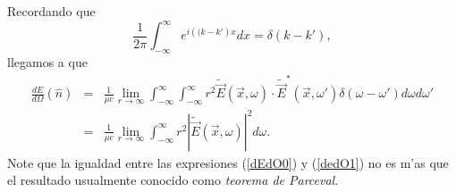 Recordando que
\begin{equation}
\frac{1}{2\pi}\int_{-\infty}^{\infty }e^{i\left((  k-k' \right)  x}dx=
\delta\left(  k-k' \right),
\end{equation}
llegamos a que
\begin{eqnarray}
\frac{dE}{d\Omega}(\hat{n})
&=&\frac{1}{\mu c}\lim_{r\to\infty}\int_{-\infty}^{\infty}\int_{-\infty}^{\infty} r^2\tilde{\vec{E}}(\vec{x},\omega)\cdot\tilde{\vec{E}}^\ast(\vec{x},\omega') \delta (\omega-\omega')  d\omega d\omega'\\
&=&\frac{1}{\mu c}\lim_{r\to\infty}\int_{-\infty}^{\infty}r^2\left|\tilde{\vec{E}}(\vec{x},\omega)\right|^2 d\omega. \label{dedO1}
\end{eqnarray}
Note que la igualdad entre las expresiones (\ref{dEdO0}) y (\ref{dedO1}) no es m'as que el resultado usualmente conocido como \textit{teorema de Parceval}.

